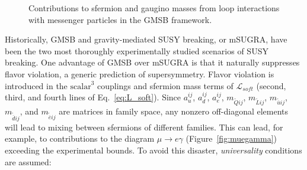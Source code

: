 \documentclass[dissertation.tex]{subfiles}
\begin{document}
\begin{figure}
	\caption{Contributions to sfermion and gaugino masses from loop interactions with messenger particles in the GMSB framework.}
	\label{fig:gaugino_sfermion_GMSB_mass_terms}
\end{figure}

Historically, GMSB and gravity-mediated SUSY breaking, or mSUGRA\cite{mSUGRA}, have been the two most thoroughly experimentally studied scenarios of SUSY breaking.  One advantage of GMSB over mSUGRA is that it naturally suppresses flavor violation, a generic prediction of supersymmetry.  Flavor violation is introduced in the $\mbox{scalar}^{3}$ couplings and sfermion mass terms of $\mathcal{L}_{soft}$ (second, third, and fourth lines of Eq.~\ref{eq:L_soft}).  Since $a_{u}^{ij}$, $a_{d}^{ij}$, $a_{e}^{ij}$, $m_{\widetilde{Q}ij}$, $m_{\widetilde{L}ij}$, $m_{\widetilde{\overline{u}}ij}$, $m_{\widetilde{\overline{d}}ij}$, and $m_{\widetilde{\overline{e}}ij}$ are matrices in family space, any nonzero off-diagonal elements will lead to mixing between sfermions of different families.  This can lead, for example, to contributions to the diagram $\mu\rightarrow e\gamma$ (Figure~\ref{fig:muegamma}) exceeding the experimental bounds.  To avoid this disaster, \textit{universality} conditions are assumed:
\end{document}
